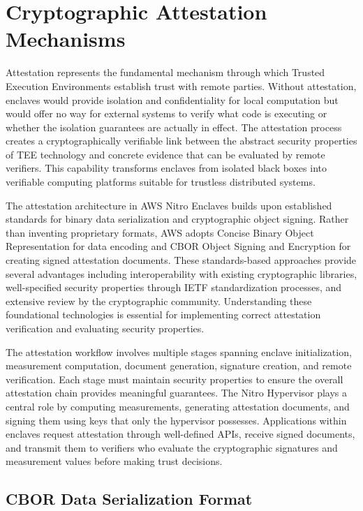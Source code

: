 \section{Cryptographic Attestation Mechanisms}

Attestation represents the fundamental mechanism through which Trusted Execution Environments establish trust with remote parties. Without attestation, enclaves would provide isolation and confidentiality for local computation but would offer no way for external systems to verify what code is executing or whether the isolation guarantees are actually in effect. The attestation process creates a cryptographically verifiable link between the abstract security properties of TEE technology and concrete evidence that can be evaluated by remote verifiers. This capability transforms enclaves from isolated black boxes into verifiable computing platforms suitable for trustless distributed systems.

The attestation architecture in AWS Nitro Enclaves builds upon established standards for binary data serialization and cryptographic object signing. Rather than inventing proprietary formats, AWS adopts Concise Binary Object Representation for data encoding and CBOR Object Signing and Encryption for creating signed attestation documents. These standards-based approaches provide several advantages including interoperability with existing cryptographic libraries, well-specified security properties through IETF standardization processes, and extensive review by the cryptographic community. Understanding these foundational technologies is essential for implementing correct attestation verification and evaluating security properties.

The attestation workflow involves multiple stages spanning enclave initialization, measurement computation, document generation, signature creation, and remote verification. Each stage must maintain security properties to ensure the overall attestation chain provides meaningful guarantees. The Nitro Hypervisor plays a central role by computing measurements, generating attestation documents, and signing them using keys that only the hypervisor possesses. Applications within enclaves request attestation through well-defined APIs, receive signed documents, and transmit them to verifiers who evaluate the cryptographic signatures and measurement values before making trust decisions.

\subsection{CBOR Data Serialization Format}

